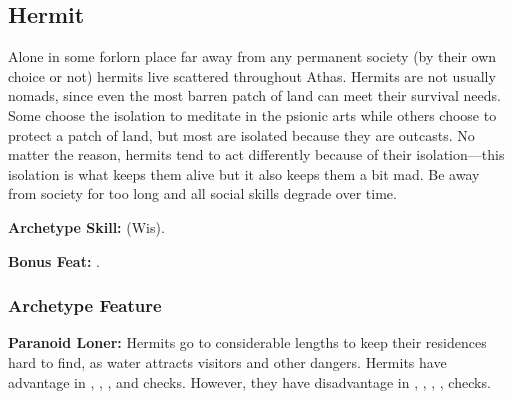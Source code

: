 \subsection{Hermit}
Alone in some forlorn place far away from any permanent society (by their own choice or not) hermits live scattered throughout Athas. Hermits are not usually nomads, since even the most barren patch of land can meet their survival needs. Some choose the isolation to meditate in the psionic arts while others choose to protect a patch of land, but most are isolated because they are outcasts. No matter the reason, hermits tend to act differently because of their isolation---this isolation is what keeps them alive but it also keeps them a bit mad. Be away from society for too long and all social skills degrade over time.

\textbf{Archetype Skill:}  (Wis).

\textbf{Bonus Feat:} .

\subsubsection{Archetype Feature}
\textbf{Paranoid Loner:} Hermits go to considerable lengths to keep their residences hard to find, as water attracts visitors and other dangers. Hermits have advantage in , , , and  checks. However, they have disadvantage in , , , ,  checks.
